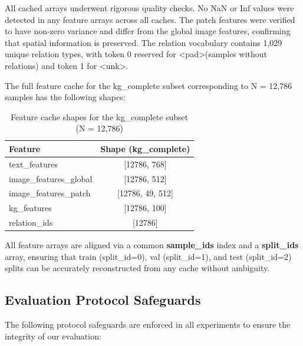 All cached arrays underwent rigorous quality checks. No NaN or Inf values were detected in any feature arrays across all caches. The patch features were verified to have non-zero variance and differ from the global image features, confirming that spatial information is preserved. The relation vocabulary contains 1,029 unique relation types, with token 0 reserved for \textless pad\textgreater (samples without relations) and token 1 for \textless unk\textgreater.

The full feature cache for the kg\_complete subset corresponding to N = 12,786 samples has the following shapes:

\begin{table}[!htbp]
\centering
\caption{Feature cache shapes for the kg\_complete subset (N = 12,786)}
\begin{tabularx}{\linewidth}{|X|c|}
\hline
\textbf{Feature} & \textbf{Shape (kg\_complete)} \\
\hline
text\_features & [12786, 768] \\
\hline
image\_features\_global & [12786, 512] \\
\hline
image\_features\_patch & [12786, 49, 512] \\
\hline
kg\_features & [12786, 100] \\
\hline
relation\_ids & [12786] \\
\hline
\end{tabularx}
\end{table}

All feature arrays are aligned via a common \textbf{sample\_ids} index and a \textbf{split\_ids} array, ensuring that train (split\_id=0), val (split\_id=1), and test (split\_id=2) splits can be accurately reconstructed from any cache without ambiguity.

\subsection{Evaluation Protocol Safeguards}
The following protocol safeguards are enforced in all experiments to ensure the integrity of our evaluation:

